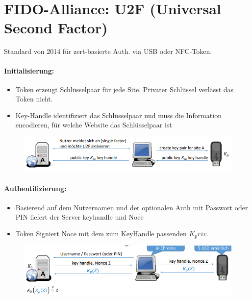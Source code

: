 \section{FIDO-Alliance: U2F (Universal Second Factor)}
Standard von 2014 für zert-basierte Auth. via USB oder NFC-Token.

\paragraph{Initialisierung:}

\begin{itemize}
	\item Token erzeugt Schlüsselpaar für jede Site. Privater Schlüssel verlässt das Token nicht.
	\item Key-Handle identifiziert das Schlüsselpaar und muss die Information encodieren, für welche Website das Schlüsselpaar ist 
\end{itemize}
\begin{figure}[H]
	\begin{center}
		\includegraphics[scale=0.8]{Resources/FIDO1.png}
		\caption{}
		\label{fig:FIDO1.png}
	\end{center}
\end{figure}

\paragraph{Authentifizierung:}
\begin{itemize}
	\item Basierend auf dem Nutzernamen und der optionalen Auth mit Passwort oder PIN liefert der Server keyhandle und Noce
	\item Token Signiert Noce mit dem zum KeyHandle passenden $K_priv$. 
\end{itemize}

\begin{figure}[H]
	\begin{center}
		\includegraphics[scale=0.8]{Resources/Fido2}
		\caption{}
		\label{fig:Fido2}
	\end{center}
\end{figure}

